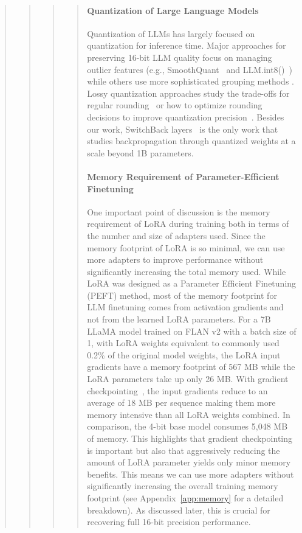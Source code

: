 \begin{quote}
\begin{quote}
\begin{quote}
\begin{quote}
\paragraph{Quantization of Large Language Models} Quantization of LLMs has largely focused on quantization for inference time. Major approaches for preserving 16-bit LLM quality focus on managing outlier features (e.g., SmoothQuant~\citep{xiao2022smoothquant} and LLM.int8()~\citep{dettmers2022llm}) while others use more sophisticated grouping methods \citep{park2022nuqmm, yao2022zeroquant}. Lossy quantization approaches study the trade-offs for regular rounding~\citep{dettmers2022case,zeng2022glm,pope2022efficiently} or how to optimize rounding decisions to improve quantization precision~\citep{frantar2022gptq}. Besides our work, SwitchBack layers~\citep{wortsman2023stable} is the only work that studies backpropagation through quantized weights at a scale beyond 1B parameters.

\paragraph{Memory Requirement of Parameter-Efficient Finetuning} One important point of discussion is the memory requirement of LoRA during training both in terms of the number and size of adapters used. Since the memory footprint of LoRA is so minimal, we can use more adapters to improve performance without significantly increasing the total memory used. While LoRA was designed as a Parameter Efficient Finetuning (PEFT) method, most of the memory footprint for LLM finetuning comes from activation gradients and not from the learned LoRA parameters. For a 7B LLaMA model trained on FLAN v2 with a batch size of 1, with LoRA weights equivalent to commonly used 0.2\% of the original model weights\citep{hu2021lora,liu2022few}, the LoRA input gradients have a memory footprint of 567 MB while the LoRA parameters take up only 26 MB. With gradient checkpointing~\citep{chen2016training}, the input gradients reduce to an average of 18 MB per sequence making them more memory intensive than all LoRA weights combined. In comparison, the 4-bit base model consumes 5,048 MB of memory. This highlights that gradient checkpointing is important but also that aggressively reducing the amount of LoRA parameter yields only minor memory benefits. This means we can use more adapters without significantly increasing the overall training memory footprint (see Appendix~\ref{app:memory} for a detailed breakdown). As discussed later, this is crucial for recovering full 16-bit precision performance.


\end{quote}
\end{quote}
\end{quote}
\end{quote}
